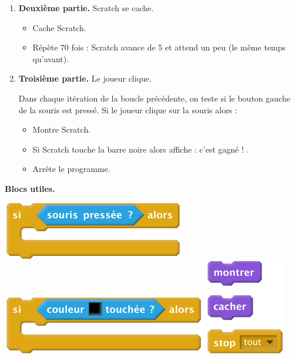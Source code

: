 \documentclass[class=report,crop=false, 12pt]{standalone}
\begin{document}
\begin{activite}
\begin{enumerate}
  
  \item \textbf{Deuxième partie.} Scratch se cache.
  
  \begin{itemize}
    \item Cache Scratch.
    \item Répète 70 fois : Scratch avance de 5 et attend un peu (le même temps qu'avant). 
  \end{itemize}
  
  \item \textbf{Troisième partie.} Le joueur clique.
  
  Dans chaque itération de la boucle précédente, on teste si le bouton gauche de la souris est pressé. Si le joueur clique sur la souris alors :
  \begin{itemize}
    \item Montre Scratch.  
    \item Si Scratch touche la barre noire alors affiche : \og c'est gagné ! \fg{}.
    \item Arrête le programme.
  \end{itemize}  
\end{enumerate}

\bigskip
\textbf{Blocs utiles.}
\begin{center}
  \includegraphics[scale=\scalebloc]{bloc-04-ex3a}\quad
  \includegraphics[scale=\scalebloc]{bloc-04-ex3b}\quad
  \includegraphics[scale=\scalebloc]{bloc-04-ex3c}    
\end{center}

\end{activite}
\end{document}
